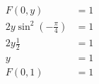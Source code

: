 \documentclass[a4paper,norsk,12pt]{article}
\begin{document}








\begin{align*}
  F(0,y) &= 1 \\
  2y \sin^2(-\frac{\pi}{4}) &= 1 \\
  2y\frac{1}{2} &= 1 \\
  y &= 1 \\
  F(0,1) &= 1
\end{align*}
\end{document}

